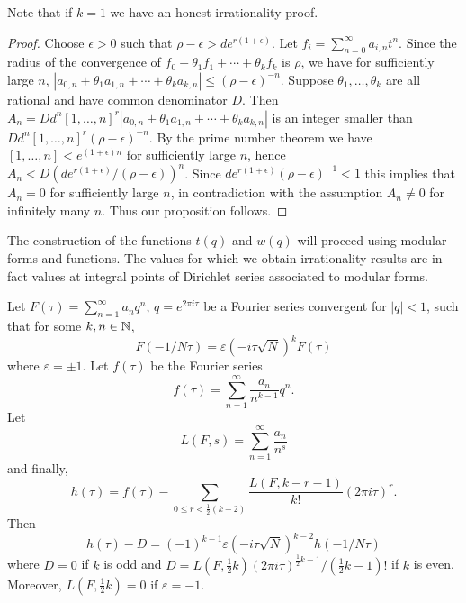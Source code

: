 \begin{remark}
    Note that if $k = 1$ we have an honest irrationality proof.
\end{remark}

\begin{proof}
    Choose $\epsilon > 0$ such that $\rho - \epsilon > d e^{r(1 + \epsilon)}$.
    Let $f_i = \sum_{n=0}^{\infty} a_{i,n} t^n$.
    Since the radius of the convergence of $f_0 + \theta_1 f_1 + \cdots + \theta_k f_k$ is $\rho$,
    we have for sufficiently large $n$, $|a_{0,n} + \theta_1 a_{1,n} + \cdots + \theta_k a_{k,n}| \le (\rho - \epsilon)^{-n}$.
    Suppose $\theta_1, \dots, \theta_k$ are all rational and have common denominator $D$.
    Then $A_n = D d^n [1, \dots, n]^r |a_{0,n} + \theta_1 a_{1,n} + \cdots + \theta_k a_{k,n}|$ is an integer smaller than
    $D d^n [1, \dots, n]^r (\rho - \epsilon)^{-n}$.
    By the prime number theorem we have $[1, \dots, n] < e^{(1 + \epsilon)n}$ for sufficiently large $n$,
    hence $A_n < D (d e^{r(1 + \epsilon)} / (\rho - \epsilon))^{n}$.
    Since $d e^{r(1 + \epsilon)}  (\rho - \epsilon)^{-1} < 1$ this implies that $A_n = 0$ for sufficiently large $n$,
    in contradiction with the assumption $A_n \ne 0$ for infinitely many $n$.
    Thus our proposition follows. 
\end{proof}

The construction of the functions $t(q)$ and $w(q)$ will proceed using
modular forms and functions. The values for which we obtain irrationality
results are in fact values at integral points of Dirichlet series
associated to modular forms.

\begin{proposition}
    Let $F(\tau) = \sum_{n=1}^{\infty} a_n q^n$, $q = e^{2 \pi i \tau}$ be a Fourier series
    convergent for $|q| < 1$, such that for some $k, n \in \mathbb{N}$,
    $$
        F(-1/N\tau) = \varepsilon(-i\tau \sqrt{N})^{k} F(\tau)
    $$
    where $\varepsilon = \pm 1$.
    Let $f(\tau)$ be the Fourier series
    $$
        f(\tau) = \sum_{n = 1}^{\infty} \frac{a_n}{n^{k-1}} q^n.
    $$
    Let
    $$
        L(F, s) = \sum_{n=1}^{\infty} \frac{a_n}{n^s}
    $$
    and finally,
    $$
        h(\tau) = f(\tau) - \sum_{0 \le r < \frac{1}{2}(k - 2)} \frac{L(F, k - r - 1)}{k!} (2 \pi i \tau)^r.
    $$
    Then
    $$
        h(\tau) - D = (-1)^{k-1} \varepsilon (-i\tau \sqrt{N})^{k-2} h(-1/N\tau)
    $$
    where $D = 0$ if $k$ is odd and $D = L(F, \frac{1}{2}k) (2 \pi i \tau)^{\frac{1}{2}k - 1} / (\frac{1}{2}k - 1)!$ if $k$ is even.
    Moreover, $L(F, \frac{1}{2}k) = 0$ if $\varepsilon = -1$.
\end{proposition}

